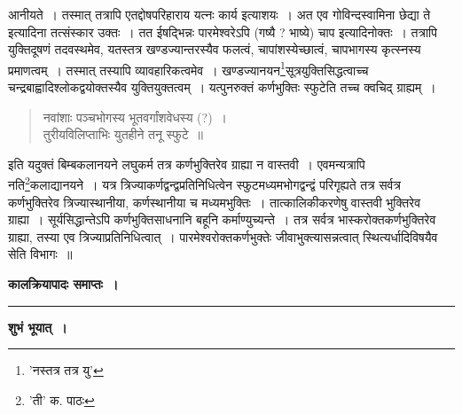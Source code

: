 \documentclass[11pt, openany]{book}
\begin{document}
{{{{\vspace{0.3cm}
\noindent आनीयते~। तस्मात् तत्रापि एतद्दोषपरिहाराय यत्नः कार्य इत्याशयः~। अत एव गोविन्दस्वामिना {\qt छेद्या ते} इत्यादिना तत्संस्कार उक्तः~। तत ईषद्भिन्नः पारमेश्वरेऽपि (गष्यै ? भाष्ये) {\qt चाप} इत्यादिनोक्तः~। तत्रापि युक्तिदूषणं तदवस्थमेव, यतस्तत्र खण्डज्यान्तरस्यैव फलत्वं, चापांशस्येच्छात्वं, चापभागस्य कृत्स्नस्य प्रमाणत्वम्~। तस्मात् तस्यापि व्यावहारिकत्वमेव~। खण्डज्यानयन\renewcommand{\thefootnote}{१}\footnote{'नस्तत्र तत्र यु'}सूत्रयुक्तिसिद्धत्वाच्च चन्द्रबाह्वादिश्लोकद्वयोक्तस्यैव
युक्तियुक्तत्वम्~। यत्पुनरुक्तं कर्णभुक्तिः स्फुटेति तच्च क्वचिद् ग्राह्यम्~। 

\begin{quote}
{\qt नवांशाः पञ्चभोगस्य भूतवर्गांशवेधस्य (?)~।\\
तुरीयविलिप्ताभिः युतहीने तनू स्फुटे~॥}
\end{quote}

\noindent इति यदुक्तं बिम्बकलानयने लघुकर्म तत्र कर्णभुक्तिरेव ग्राह्या न वास्तवी~। एवमन्यत्रापि नति\renewcommand{\thefootnote}{२}\footnote{'ती' क. पाठः}कलाद्यानयने~। यत्र
त्रिज्याकर्णद्वन्द्वप्रतिनिधित्वेन स्फुटमध्यमभोगद्वन्द्वं परिगृह्यते तत्र सर्वत्र कर्णभुक्तिरेव त्रिज्यास्थानीया, कर्णस्थानीया च मध्यमभुक्तिः~। तात्कालिकीकरणेषु वास्तवी भुक्तिरेव ग्राह्या~। सूर्यसिद्धान्तेऽपि कर्णभुक्तिसाधनानि बहूनि कर्माण्युच्यन्ते~। तत्र सर्वत्र भास्करोक्तकर्णभुक्तिरेव ग्राह्या, तस्या एव त्रिज्याप्रतिनिधित्वात्~। पारमेश्वरोक्तकर्णभुक्तेः जीवाभुक्त्यासन्नत्वात् स्थित्यर्धादिविषयैव सेति विभागः~॥
\vspace{1.5cm}

\begin{center}
\textbf{कालक्रियापादः समाप्तः~।}\\
\rule{3cm}{.3mm} 
\end{center}

\begin{center}
\textbf{शुभं भूयात्~। }
\end{center}

}}}}
\end{document}
